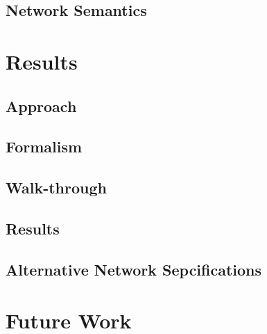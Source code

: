 \documentclass{thesis}
\begin{document}
  \section{Network Semantics}

  \chapter{Results}
  \section{Approach}
  \section{Formalism}
  \section{Walk-through}
  \section{Results}
  \section{Alternative Network Sepcifications}

  \chapter{Future Work}

  \newpage
  
\end{document}

